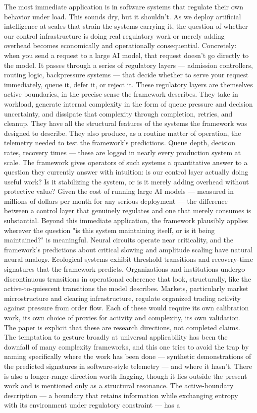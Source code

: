 \documentclass[12pt]{article}
\begin{document}
The most immediate application is in software systems that regulate their own behavior under load. This sounds dry, but it shouldn't. As we deploy artificial intelligence at scales that strain the systems carrying it, the question of whether our control infrastructure is doing real regulatory work or merely adding overhead becomes economically and operationally consequential. Concretely: when you send a request to a large AI model, that request doesn't go directly to the model. It passes through a series of regulatory layers --- admission controllers, routing logic, backpressure systems --- that decide whether to serve your request immediately, queue it, defer it, or reject it. These regulatory layers are themselves active boundaries, in the precise sense the framework describes. They take in workload, generate internal complexity in the form of queue pressure and decision uncertainty, and dissipate that complexity through completion, retries, and cleanup. They have all the structural features of the systems the framework was designed to describe. They also produce, as a routine matter of operation, the telemetry needed to test the framework's predictions. Queue depth, decision rates, recovery times --- these are logged in nearly every production system at scale. The framework gives operators of such systems a quantitative answer to a question they currently answer with intuition: is our control layer actually doing useful work? Is it stabilizing the system, or is it merely adding overhead without protective value? Given the cost of running large AI models --- measured in millions of dollars per month for any serious deployment --- the difference between a control layer that genuinely regulates and one that merely consumes is substantial. Beyond this immediate application, the framework plausibly applies wherever the question "is this system maintaining itself, or is it being maintained?" is meaningful. Neural circuits operate near criticality, and the framework's predictions about critical slowing and amplitude scaling have natural neural analogs. Ecological systems exhibit threshold transitions and recovery-time signatures that the framework predicts. Organizations and institutions undergo discontinuous transitions in operational coherence that look, structurally, like the active-to-quiescent transitions the model describes. Markets, particularly market microstructure and clearing infrastructure, regulate organized trading activity against pressure from order flow. Each of these would require its own calibration work, its own choice of proxies for activity and complexity, its own validation. The paper is explicit that these are research directions, not completed claims. The temptation to gesture broadly at universal applicability has been the downfall of many complexity frameworks, and this one tries to avoid the trap by naming specifically where the work has been done --- synthetic demonstrations of the predicted signatures in software-style telemetry --- and where it hasn't. There is also a longer-range direction worth flagging, though it lies outside the present work and is mentioned only as a structural resonance. The active-boundary description --- a boundary that retains information while exchanging entropy with its environment under regulatory constraint --- has a 
\end{document}

